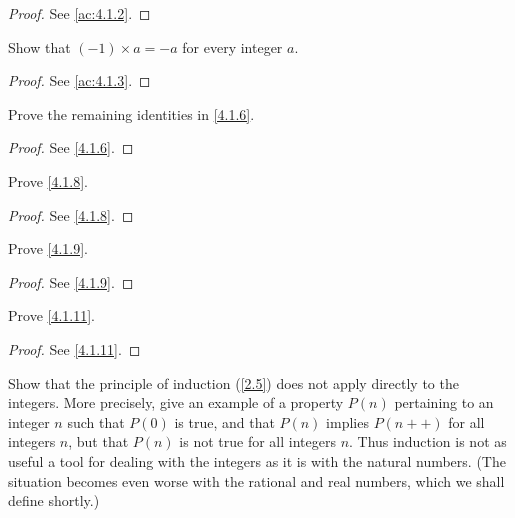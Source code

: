 \begin{proof}
  See \cref{ac:4.1.2}.
\end{proof}

\begin{ex}\label{ex:4.1.3}
  Show that \((-1) \times a = -a\) for every integer \(a\).
\end{ex}

\begin{proof}
  See \cref{ac:4.1.3}.
\end{proof}

\begin{ex}\label{ex:4.1.4}
  Prove the remaining identities in \cref{4.1.6}.
\end{ex}

\begin{proof}
  See \cref{4.1.6}.
\end{proof}

\begin{ex}\label{ex:4.1.5}
  Prove \cref{4.1.8}.
\end{ex}

\begin{proof}
  See \cref{4.1.8}.
\end{proof}

\begin{ex}\label{ex:4.1.6}
  Prove \cref{4.1.9}.
\end{ex}

\begin{proof}
  See \cref{4.1.9}.
\end{proof}

\begin{ex}\label{ex:4.1.7}
  Prove \cref{4.1.11}.
\end{ex}

\begin{proof}
  See \cref{4.1.11}.
\end{proof}

\begin{ex}\label{ex:4.1.8}
  Show that the principle of induction (\cref{2.5}) does not apply directly to the integers.
  More precisely, give an example of a property \(P(n)\) pertaining to an integer \(n\) such that \(P(0)\) is true, and that \(P(n)\) implies \(P(n++)\) for all integers \(n\), but that \(P(n)\) is not true for all integers \(n\).
  Thus induction is not as useful a tool for dealing with the integers as it is with the natural numbers.
  (The situation becomes even worse with the rational and real numbers, which we shall define shortly.)
\end{ex}

